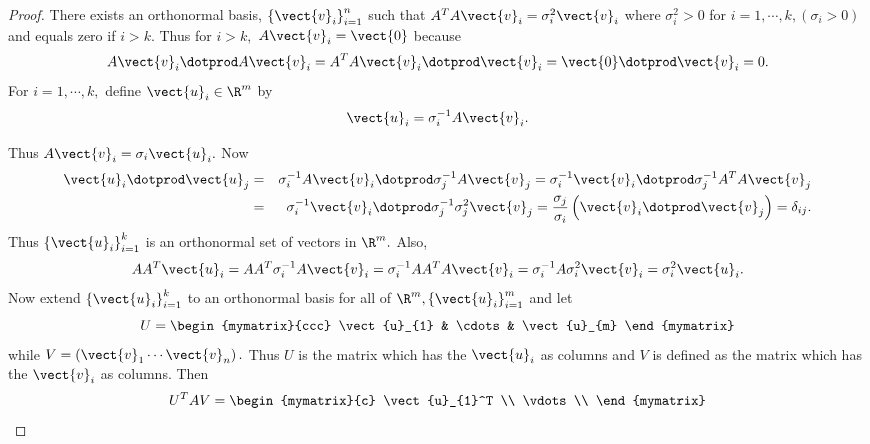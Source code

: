 \begin{proof}
There exists an orthonormal basis, $\left\{ \vect{v}_{i}\right\} _{i=1}^{n}$ such that $
A^TA\vect{v}_{i}=\sigma _{i}^{2}\vect{v}_{i}$ where $\sigma
_{i}^{2}>0$ for $i=1,\cdots ,k,\left( \sigma _{i}>0\right) $ and equals zero
if $i>k.$ Thus for $i>k,$ $A\vect{v}_{i}=\vect{0}$ because 
\begin{equation*}
 A\vect{v}_{i}\dotprod A\vect{v}_{i} = A^TA\vect{v}_{i} \dotprod \vect{v}_{i}  = \vect{0} \dotprod \vect{v}_{i} =0.
\end{equation*}
For $i=1,\cdots ,k,$ define $\vect{u}_{i}\in \R^{m}$ by 
\begin{equation*}
\vect{u}_{i}= \sigma _{i}^{-1}A\vect{v}_{i}.
\end{equation*}

Thus $A\vect{v}_{i}=\sigma _{i}\vect{u}_{i}.$ Now 
\begin{eqnarray*}
\vect{u}_{i} \dotprod \vect{u}_{j} &=&  \sigma _{i}^{-1}A
\vect{v}_{i} \dotprod \sigma _{j}^{-1}A\vect{v}_{j}  = \sigma_{i}^{-1}\vect{v}_{i} \dotprod \sigma _{j}^{-1}A^TA\vect{v}_{j} \\
&=& \sigma _{i}^{-1}\vect{v}_{i} \dotprod \sigma _{j}^{-1}\sigma _{j}^{2} \vect{v}_{j} =
\frac{\sigma _{j}}{\sigma _{i}}\left( \vect{v}_{i} \dotprod \vect{v}_{j}\right)
=\delta _{ij}.
\end{eqnarray*}
Thus $\left\{ \vect{u}_{i}\right\} _{i=1}^{k}$ is an orthonormal set of
vectors in $\R^{m}.$ Also, 
\begin{equation*}
AA^T\vect{u}_{i}=AA^T\sigma _{i}^{-1}A\vect{v}_{i}=\sigma
_{i}^{-1}AA^TA\vect{v}_{i}=\sigma _{i}^{-1}A\sigma _{i}^{2}\vect{v}
_{i}=\sigma _{i}^{2}\vect{u}_{i}.
\end{equation*}
Now extend $\left\{ \vect{u}_{i}\right\} _{i=1}^{k}$ to an orthonormal
basis for all of $\R^{m},\left\{ \vect{u}_{i}\right\} _{i=1}^{m}$
and let 
\begin{equation*}
U= \begin{mymatrix}{ccc}
\vect{u}_{1} & \cdots & \vect{u}_{m}
\end{mymatrix}
\end{equation*}
while $V= \left( \vect{v}_{1}\cdots \vect{v}_{n}\right) .$ Thus $U$
is the matrix which has the $\vect{u}_{i}$ as columns and $V$ is defined
as the matrix which has the $\vect{v}_{i}$ as columns. Then 
\begin{equation*}
U^TAV=\begin{mymatrix}{c}
\vect{u}_{1}^T \\ 
\vdots \\ 

\end{mymatrix}
\end{equation*}
\end{proof}
